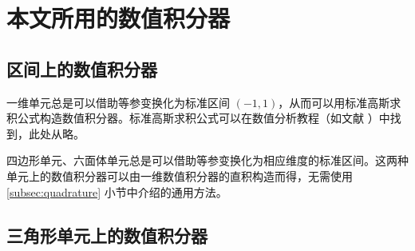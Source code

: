 
\chapter{本文所用的数值积分器\label{chap:gaussian_pairs}}

\section{区间上的数值积分器}

一维单元总是可以借助等参变换化为标准区间 $(-1,1)$，从而可以用标准高斯求积公式构造数值积分器。标准高斯求积公式可以在数值分析教程（如文献 \cite{Quarteroni_2007}）中找到，此处从略。

四边形单元、六面体单元总是可以借助等参变换化为相应维度的标准区间。这两种单元上的数值积分器可以由一维数值积分器的直积构造而得，无需使用
\ref{subsec:quadrature} 小节中介绍的通用方法。

\section{三角形单元上的数值积分器}


